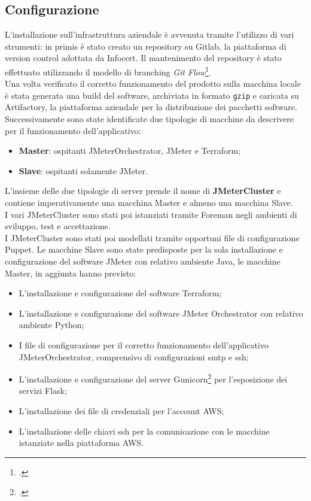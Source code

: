 \subsection{Configurazione}
L'installazione sull'infrastruttura aziendale è avvenuta tramite l'utilizzo di vari strumenti: in primis è stato creato un repository su Gitlab, la piattaforma di version control adottata da Infocert. Il mantenimento del repository è stato effettuato utilizzando il modello di branching \textit{Git Flow}\footcite{article:gitflow}. \\
Una volta verificato il corretto funzionamento del prodotto sulla macchina locale è stata generata una \gls{build} del software, archiviata in formato \texttt{gzip} e caricata su Artifactory, la piattaforma aziendale per la distribuzione dei pacchetti software.\\
Successivamente sono state identificate due tipologie di macchine da descrivere per il funzionamento dell'applicativo:
\begin{itemize}
	\item \textbf{Master}: ospitanti JMeterOrchestrator, JMeter e Terraform;
	\item \textbf{Slave}: ospitanti solamente JMeter.
\end{itemize}
L'insieme delle due tipologie di server prende il nome di \textbf{JMeterCluster} e contiene imperativamente una macchina Master e almeno una macchina Slave.\\
I vari JMeterCluster sono stati poi istanziati tramite Foreman negli ambienti di sviluppo, test e accettazione.\\
I JMeterCluster sono stati poi modellati tramite opportuni file di configurazione Puppet. Le macchine Slave sono state predisposte per la sola installazione e configurazione del software JMeter con relativo ambiente Java, le macchine Master, in aggiunta hanno previsto:
\begin{itemize}
	\item L'installazione e configurazione del software Terraform;
	\item L'installazione e configurazione del software JMeter Orchestrator con relativo ambiente Python;
	\item I file di configurazione per il corretto funzionamento dell'applicativo JMeterOrchestrator, comprensivo di configurazioni \gls{smtp} e \gls{ssh};
	\item L'installazione e configurazione del server Gunicorn\footcite{site:gunicorn} per l'esposizione dei servizi Flask;
	\item L'installazione dei file di credenziali per l'account AWS;
	\item L'installazione delle chiavi \gls{ssh} per la comunicazione con le macchine istanziate nella piattaforma AWS.
\end{itemize}
